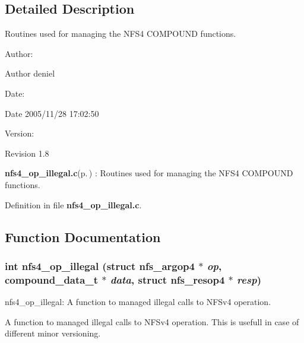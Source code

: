 \subsection{Detailed Description}
Routines used for managing the NFS4 COMPOUND functions. 

\begin{Desc}
\item[Author:]\begin{Desc}
\item[Author]deniel \end{Desc}
\end{Desc}
\begin{Desc}
\item[Date:]\begin{Desc}
\item[Date]2005/11/28 17:02:50 \end{Desc}
\end{Desc}
\begin{Desc}
\item[Version:]\begin{Desc}
\item[Revision]1.8 \end{Desc}
\end{Desc}
{\bf nfs4\_\-op\_\-illegal.c}{\rm (p.\,\pageref{nfs4__op__illegal_8c})} : Routines used for managing the NFS4 COMPOUND functions.

Definition in file {\bf nfs4\_\-op\_\-illegal.c}.

\subsection{Function Documentation}
\subsubsection{\setlength{\rightskip}{0pt plus 5cm}int nfs4\_\-op\_\-illegal (struct nfs\_\-argop4 $\ast$ {\em op}, compound\_\-data\_\-t $\ast$ {\em data}, struct nfs\_\-resop4 $\ast$ {\em resp})}\label{nfs4__op__illegal_8c_a0}


nfs4\_\-op\_\-illegal: A function to managed illegal calls to NFSv4 operation.

A function to managed illegal calls to NFSv4 operation. This is usefull in case of different minor versioning.

